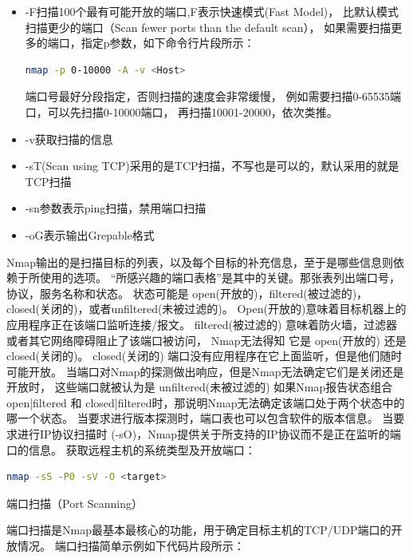 \documentclass[12pt]{book}
\makeatletter
\numberwithin{dummy}{section}
\theoremstyle{ocrenumbox}
\theoremstyle{blacknumex}
\theoremstyle{blacknumbox}
\theoremstyle{ocrenum}
\renewcommand{\subsection}{\@startsection {subsection}{2}{\z@}
	{-3ex \@plus -0.1ex \@minus -.4ex}
	{0.5ex \@plus.2ex }
	{\normalfont\sffamily\bfseries}}
\makeatother
\begin{document}
\begin{itemize}
	\item{-F}扫描100个最有可能开放的端口,F表示快速模式(Fast Model)，
	比默认模式扫描更少的端口（Scan fewer ports than the default scan），
	如果需要扫描更多的端口，指定p参数，如下命令行片段所示：
	
\begin{lstlisting}[language=Bash]
nmap -p 0-10000 -A -v <Host>
\end{lstlisting}
	
	端口号最好分段指定，否则扫描的速度会非常缓慢，
	例如需要扫描0-65535端口，可以先扫描0-10000端口，
	再扫描10001-20000，依次类推。
	
	\item{-v}获取扫描的信息
	\item{-sT(Scan using TCP)}采用的是TCP扫描，不写也是可以的，默认采用的就是TCP扫描
	\item{-sn参数表示ping扫描，禁用端口扫描}
	\item{-oG表示输出Grepable格式}
\end{itemize}

Nmap输出的是扫描目标的列表，以及每个目标的补充信息，至于是哪些信息则依赖于所使用的选项。
“所感兴趣的端口表格”是其中的关键。那张表列出端口号，协议，服务名称和状态。
状态可能是 open(开放的)，filtered(被过滤的)， closed(关闭的)，或者unfiltered(未被过滤的)。
Open(开放的)意味着目标机器上的应用程序正在该端口监听连接/报文。 
filtered(被过滤的) 意味着防火墙，过滤器或者其它网络障碍阻止了该端口被访问，
Nmap无法得知 它是 open(开放的) 还是 closed(关闭的)。 
closed(关闭的) 端口没有应用程序在它上面监听，但是他们随时可能开放。 
当端口对Nmap的探测做出响应，但是Nmap无法确定它们是关闭还是开放时，
这些端口就被认为是 unfiltered(未被过滤的) 如果Nmap报告状态组合 
open|filtered 和 closed|filtered时，那说明Nmap无法确定该端口处于两个状态中的哪一个状态。
当要求进行版本探测时，端口表也可以包含软件的版本信息。
当要求进行IP协议扫描时 (-sO)，Nmap提供关于所支持的IP协议而不是正在监听的端口的信息。
获取远程主机的系统类型及开放端口：

\begin{lstlisting}[language=Bash]
nmap -sS -P0 -sV -O <target>
\end{lstlisting}

\subsection{端口扫描（Port Scanning）}

端口扫描是Nmap最基本最核心的功能，用于确定目标主机的TCP/UDP端口的开放情况。
端口扫描简单示例如下代码片段所示：
\end{document}
